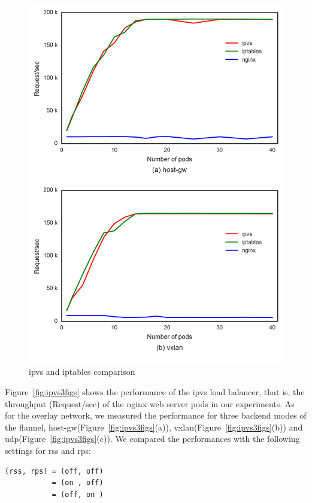 \begin{figure}
\includegraphics[width=\columnwidth]{Figs/ipvs-iptables-nginx_2figs}
\caption{ipvs and iptables comparison}
\label{fig:ipvs-iptables-nginx_2figs}
\end{figure}


Figure~\ref{fig:ipvs3figs} shows the performance of the ipvs load balancer, that is, 
the throughput (Request/sec) of the nginx web server pods in our experiments.
As for the overlay network, we measured the performance for three backend modes of the flannel, 
host-gw(Figure~\ref{fig:ipvs3figs}(a)), vxlan(Figure~\ref{fig:ipvs3figs}(b)) and udp(Figure~\ref{fig:ipvs3figs}(c)).
%
We compared the performances with the following settings for rss and rps: 

\begin{center}
\begin{minipage}{0.8\columnwidth}
\begin{verbatim}
(rss, rps) = (off, off)
           = (on , off)
           = (off, on )
\end{verbatim}
\end{minipage}
\end{center}

